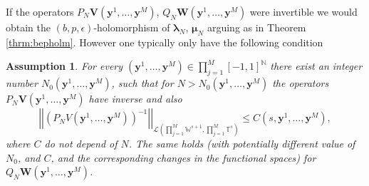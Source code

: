 \documentclass{article}
\newtheorem{assumption}[theorem]{Assumption}
\newcommand{\bmu} {\bm{\mu}}
\newcommand{\IN}{{\mathbb N}}
\newcommand{\IT}{{\mathbb T}}
\newcommand{\IW}{{\mathbb W}}
\newcommand{\bla}{\boldsymbol \lambda}
\newcommand{\by}{\bm{y}}
\begin{document}
If the operators $P_N\mathbf{V}(\by^1,\hdots,\by^M)$, $Q_N\mathbf{W}(\by^1,\hdots,\by^M)$ were invertible we would obtain the $(b,p,\epsilon)$-holomorphism of $\bla_N$, $\bmu_N$ arguing as in Theorem \ref{thrm:bepholm}. However one typically only have the following condition 
\begin{assumption}
\label{assumption:discinverze}
For every $(\by^1,\hdots,\by^M) \in \prod_{j=1}^M [-1,1]^\IN$ there exist an integer number $N_0(\by^1,\hdots,\by^M)$, such that for $N>N_0(\by^1,\hdots,\by^M)$ the operators $P_N \mathbf{V}(\by^1,\hdots,\by^M)$ have inverse and also 
$$\left\vert \left\vert (P_N V(\by^1,\hdots,\by^M))^{-1} \right \vert \right \vert_{\mathcal{L}\left(\prod_{j=1}^M \IW^{s+1}, \prod_{j=1}^M \IT^s\right)} \leq C(s,\by^1,\hdots,\by^M),$$
where $C$ do not depend of $N$. The same holds (with potentially different value of $N_0$, and $C$, and the corresponding changes in the functional spaces) for $Q_N\mathbf{W}(\by^1,\hdots,\by^M)$.
\end{assumption}
\end{document}
